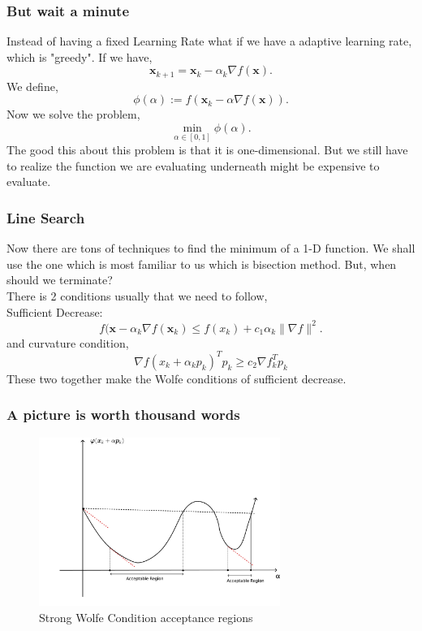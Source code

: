 \documentclass{beamer}
\begin{document}
\begin{frame}[t]
	\frametitle{But wait a minute}
	Instead of having a fixed Learning Rate what if we have a adaptive learning rate, which is "greedy".
	If we have,
	\[
		\bm x_{k+1} = \bm x_{k} - \alpha_k \nabla f(\bm x)
		.\]\pause
	We define,
	\[
		\phi(\alpha) := f(\bm x_k-\alpha \nabla f(\bm x))
		.\]\pause
	Now we solve the problem,
	\[
		\min_{\alpha \in [0,1]} \phi(\alpha)
		.\]\pause
	The good this about this problem is that it is one-dimensional. But we still have to realize the function we are evaluating underneath might be expensive to evaluate.
\end{frame}
\begin{frame}[t]
	\frametitle{Line Search}
	Now there are tons of techniques to find the minimum of a 1-D function. We shall use the one which is most familiar to us which is bisection method. \pause
	But, when should we terminate?\\\pause
	There is 2 conditions usually that we need to follow,\\
	Sufficient Decrease:
	\[
		f(\bm x- \alpha_k \nabla f(\bm x_k)  \le f(x_k) + c_1 \alpha_k \|\nabla f\|^2
		.\]
	and curvature condition,
	$$
		\nabla f\left(x_k+\alpha_k p_k\right)^T p_k \geq c_2 \nabla f_k^T p_k
	$$
	These two together make the Wolfe conditions of sufficient decrease.
\end{frame}
\begin{frame}[t]
	\frametitle{A picture is worth thousand words}
	\begin{figure}[htpb]
		\centering
		\includegraphics[width=0.7\textwidth]{drawing.png}
		\caption{Strong Wolfe Condition acceptance regions}
		\label{fig:3}
	\end{figure}

\end{frame}
\end{document}
